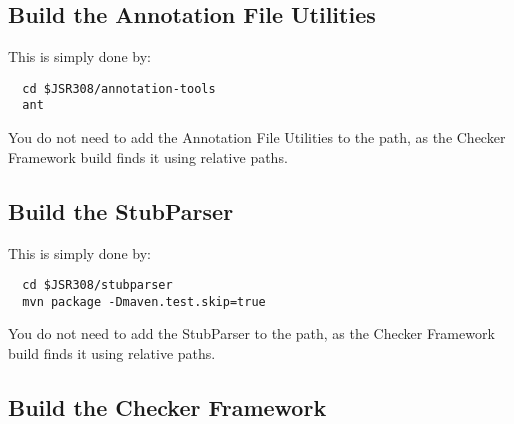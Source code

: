 


\subsection{Build the Annotation File Utilities\label{afu-building}}

This is simply done by:

\begin{Verbatim}
  cd $JSR308/annotation-tools
  ant
\end{Verbatim}

You do not need to add the Annotation File Utilities to the path, as
the Checker Framework build finds it using relative paths.


\subsection{Build the StubParser\label{stubparser-building}}

This is simply done by:

\begin{Verbatim}
  cd $JSR308/stubparser
  mvn package -Dmaven.test.skip=true
\end{Verbatim}

You do not need to add the StubParser to the path, as
the Checker Framework build finds it using relative paths.


\subsection{Build the Checker Framework\label{building}}


